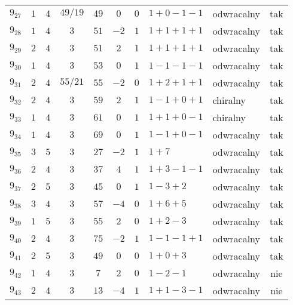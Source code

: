 \begin{longtable}{lccccccllc}
$9_{27}$    &  $1$     &  $4$  &  $49/19$  &  $49$   &  $0$   &  $0$  &  $1+0-1-1$      &  odwracalny  &  tak  \\
$9_{28}$    &  $1$     &  $4$  &  $3$      &  $51$   &  $-2$  &  $1$  &  $1+1+1+1$      &  odwracalny  &  tak  \\
$9_{29}$    &  $2$     &  $4$  &  $3$      &  $51$   &  $2$   &  $1$  &  $1+1+1+1$      &  odwracalny  &  tak  \\
$9_{30}$    &  $1$     &  $4$  &  $3$      &  $53$   &  $0$   &  $1$  &  $1-1-1-1$      &  odwracalny  &  tak  \\
$9_{31}$    &  $2$     &  $4$  &  $55/21$  &  $55$   &  $-2$  &  $0$  &  $1+2+1+1$      &  odwracalny  &  tak  \\
$9_{32}$    &  $2$     &  $4$  &  $3$      &  $59$   &  $2$   &  $1$  &  $1-1+0+1$      &  chiralny    &  tak  \\
$9_{33}$    &  $1$     &  $4$  &  $3$      &  $61$   &  $0$   &  $1$  &  $1+1+0-1$      &  chiralny    &  tak  \\
$9_{34}$    &  $1$     &  $4$  &  $3$      &  $69$   &  $0$   &  $1$  &  $1-1+0-1$      &  odwracalny  &  tak  \\
$9_{35}$    &  $3$     &  $5$  &  $3$      &  $27$   &  $-2$  &  $1$  &  $1+7$          &  odwracalny  &  tak  \\
$9_{36}$    &  $2$     &  $4$  &  $3$      &  $37$   &  $4$   &  $1$  &  $1+3-1-1$      &  odwracalny  &  tak  \\
$9_{37}$    &  $2$     &  $5$  &  $3$      &  $45$   &  $0$   &  $1$  &  $1-3+2$        &  odwracalny  &  tak  \\
$9_{38}$    &  $3$     &  $4$  &  $3$      &  $57$   &  $-4$  &  $0$  &  $1+6+5$        &  odwracalny  &  tak  \\
$9_{39}$    &  $1$     &  $5$  &  $3$      &  $55$   &  $2$   &  $0$  &  $1+2-3$        &  odwracalny  &  tak  \\
$9_{40}$    &  $2$     &  $4$  &  $3$      &  $75$   &  $-2$  &  $1$  &  $1-1-1+1$      &  odwracalny  &  tak  \\
$9_{41}$    &  $2$     &  $5$  &  $3$      &  $49$   &  $0$   &  $0$  &  $1+0+3$        &  odwracalny  &  tak  \\
$9_{42}$    &  $1$     &  $4$  &  $3$      &  $7$    &  $2$   &  $0$  &  $1-2-1$        &  odwracalny  &  nie  \\
$9_{43}$    &  $2$     &  $4$  &  $3$      &  $13$   &  $-4$  &  $1$  &  $1+1-3-1$      &  odwracalny  &  nie  \\

\end{longtable}

